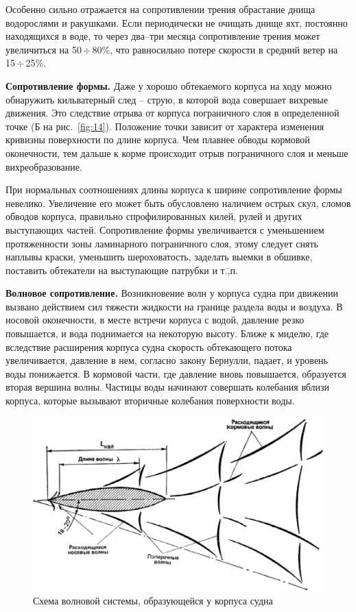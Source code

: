 \documentclass[a4paper, 12pt, twoside, final, book, russian, fittopage, cyremdash]{ncc}
\newcommand{\otdo}{\,\ensuremath{\div}\,}
\newcommand{\ris}[1]{\ref{fig:#1}}
\begin{document}
Особенно сильно отражается на сопротивлении трения обрастание днища водорослями и ракушками. Если периодически не очищать днище яхт, постоянно находящихся в воде, то через два--три месяца сопротивление трения может увеличиться на 50\otdo 80\%, что равносильно потере скорости в средний ветер на 15\otdo 25\%. 

\textbf{Сопротивление формы.} Даже у хорошо обтекаемого корпуса на ходу можно обнаружить кильватерный след \--- струю, в которой вода совершает вихревые движения. Это следствие отрыва от корпуса пограничного слоя в определенной точке (Б на рис.~\ris{14}). Положение точки зависит от характера изменения кривизны поверхности по длине корпуса. Чем плавнее обводы кормовой оконечности, тем дальше к корме происходит отрыв пограничного слоя и меньше вихреобразование. 

При нормальных соотношениях длины корпуса к ширине сопротивление формы невелико. Увеличение его может быть обусловлено наличием острых скул, сломов обводов корпуса, правильно спрофилированных килей, рулей и других выступающих частей. Сопротивление формы увеличивается с уменьшением протяженности зоны ламинарного пограничного слоя, этому следует снять наплывы краски, уменьшить шероховатость, заделать выемки в обшивке, поставить обтекатели на выступающие патрубки и т.\=,п.

\textbf{Волновое сопротивление.} Возникновение волн у корпуса судна при движении вызвано действием сил тяжести жидкости на границе раздела воды и воздуха. В носовой оконечности, в месте встречи корпуса с водой, давление резко повышается, и вода поднимается на некоторую высоту. Ближе к миделю, где вследствие расширения корпуса судна скорость обтекающего потока увеличивается, давление в нем, согласно закону Бернулли, падает, и уровень воды понижается. В кормовой части, где давление вновь повышается, образуется вторая вершина волны. Частицы воды начинают совершать колебания вблизи корпуса, которые вызывают вторичные колебания поверхности воды.

\begin{figure}[htb]
  \centering
  \includegraphics[scale=0.5]{0016.jpg}
  \caption{Схема волновой системы, образующейся у корпуса судна}
  \label{fig:16}
\end{figure}
\end{document}

